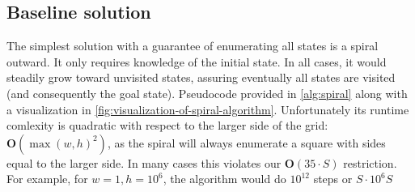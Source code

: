 \documentclass{article}
\begin{document}
\subsection*{Baseline solution}
The simplest solution with a guarantee of enumerating all states is a spiral
outward. It only requires knowledge of the initial state. In all cases, it
would steadily grow toward unvisited states, assuring eventually all states are
visited (and consequently the goal state). Pseudocode provided in
\autoref{alg:spiral} along with a visualization in
\autoref{fig:visualization-of-spiral-algorithm}. Unfortunately its runtime
comlexity is quadratic with respect to the larger side of the grid: $\mathbf
    O(\max(w, h)^2)$, as the spiral will always enumerate a square with sides equal
to the larger side. In many cases this violates our $\mathbf O(35\cdot S)$
restriction. For example, for $w=1, h = 10^6$, the algorithm would do $10^{12}$
steps or $S \cdot 10^6 S$
\end{document}
